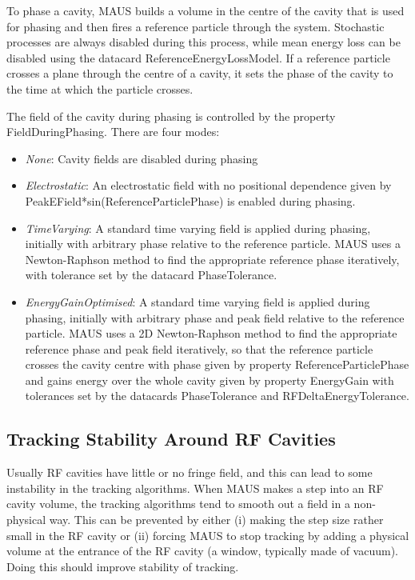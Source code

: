 To phase a cavity, MAUS builds a volume in the centre of the cavity that is used for phasing and then fires a
reference particle through the system. Stochastic processes are always disabled during this process, while mean energy
loss can be disabled using the datacard ReferenceEnergyLossModel. If a reference particle crosses a plane through the
centre of a cavity, it sets the phase of the cavity to the time at which the particle crosses. 

The field of the cavity during phasing is controlled by the property FieldDuringPhasing. There are four modes:

\liststyleLxiv
\begin{itemize}
\item \textit{None}: Cavity fields are disabled during phasing
\item \textit{Electrostatic}: An electrostatic field with no positional dependence given by
PeakEField*sin(ReferenceParticlePhase) is enabled during phasing.
\item \textit{TimeVarying}: A standard time varying field is applied during phasing, initially with arbitrary phase
relative to the reference particle. MAUS uses a Newton-Raphson method to find the appropriate reference phase
iteratively, with tolerance set by the datacard PhaseTolerance.
\item \textit{EnergyGainOptimised}: A standard time varying field is applied during phasing, initially with arbitrary
phase and peak field relative to the reference particle. MAUS uses a 2D Newton-Raphson method to find the appropriate
reference phase and peak field iteratively, so that the reference particle crosses the cavity centre with phase given
by property ReferenceParticlePhase and gains energy over the whole cavity given by property EnergyGain with tolerances
set by the datacards PhaseTolerance and RFDeltaEnergyTolerance.
\end{itemize}
\subsection{Tracking Stability Around RF Cavities}
Usually RF cavities have little or no fringe field, and this can lead to some instability in the tracking algorithms.
When MAUS makes a step into an RF cavity volume, the tracking algorithms tend to smooth out a field in a non-physical
way. This can be prevented by either (i) making the step size rather small in the RF cavity or (ii) forcing MAUS to
stop tracking by adding a physical volume at the entrance of the RF cavity (a window, typically made of vacuum). Doing
this should improve stability of tracking.


